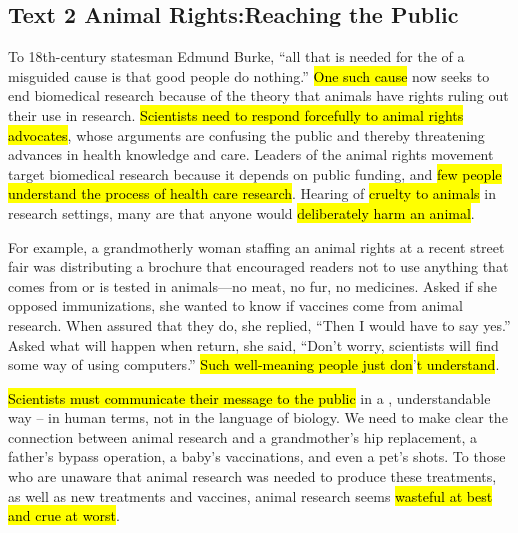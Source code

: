 \subsection{Text 2 Animal Rights:Reaching the Public}
To 
 18th-century statesman Edmund Burke, “all that is needed for the 
 of a misguided cause is that good people do nothing.” \hl{One such cause} now seeks to end biomedical research because of the theory that animals have rights 
ruling out their use in research. \hl{Scientists need to respond forcefully to animal rights advocates}, whose arguments are confusing the public and thereby threatening advances in health knowledge and care. Leaders of the animal rights movement target biomedical research because it depends on public funding, and 
\hl{few people understand the process of health care research}. Hearing 
 of \hl{cruelty to animals} in research settings, many are 
 that anyone would \hl{deliberately harm an animal}.

For example, a grandmotherly woman 
staffing an animal rights 
 at a recent street fair was distributing a brochure that encouraged readers not to use anything that comes from or is tested in animals—no meat, no fur, no medicines. Asked if she opposed immunizations, she wanted to know if vaccines come from animal research. When assured that they do, she replied, “Then I would have to say yes.” Asked what will happen when 
 return, she said, “Don’t worry, scientists will find some way of using computers.” 
\hl{Such well-meaning people just don}’\hl{t understand}.

\hl{Scientists must communicate their message to the public} in a 
, understandable way -- in human terms, not in the language of 
 biology. We need to make clear the connection between animal research and a grandmother’s hip replacement, a father’s 
bypass operation, a baby’s 
vaccinations, and even a pet’s shots. To those who are unaware that animal research was needed to produce these treatments, as well as new treatments and vaccines, animal research seems
 \hl{wasteful at best and crue at worst}.

